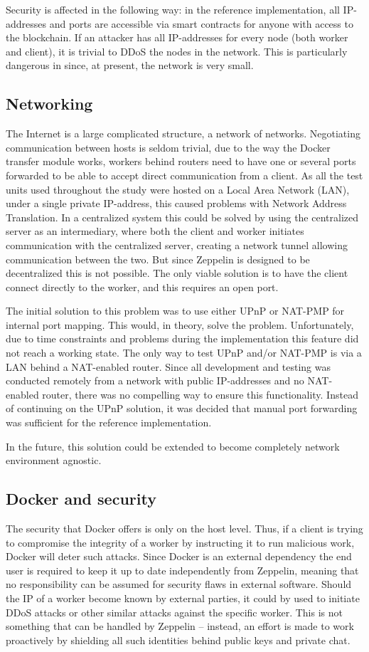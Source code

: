Security is affected in the following way: in the reference implementation, all IP-addresses and ports are accessible via smart contracts for anyone with access to the blockchain. If an attacker has all IP-addresses for every node (both worker and client), it is trivial to DDoS the nodes in the network. This is particularly dangerous in since, at present, the network is very small. 

\subsection{Networking}
The Internet is a large complicated structure, a network of networks. Negotiating communication between hosts is seldom trivial, due to the way the Docker transfer module works, workers behind routers need to have one or several ports forwarded to be able to accept direct communication from a client. As all the test units used throughout the study were hosted on a Local Area Network (LAN), under a single private IP-address, this caused problems with Network Address Translation. In a centralized system this could be solved by using the centralized server as an intermediary, where both the client and worker initiates communication with the centralized server, creating a network tunnel allowing communication between the two. But since Zeppelin is designed to be decentralized this is not possible. The only viable solution is to have the client connect directly to the worker, and this requires an open port.

The initial solution to this problem was to use either UPnP or NAT-PMP for internal port mapping. This would, in theory, solve the problem. Unfortunately, due to time constraints and problems during the implementation this feature did not reach a working state. The only way to test UPnP and/or NAT-PMP is via a LAN behind a NAT-enabled router. Since all development and testing was conducted remotely from a network with public IP-addresses and no NAT-enabled router, there was no compelling way to ensure this functionality. Instead of continuing on the UPnP solution, it was decided that manual port forwarding was sufficient for the reference implementation.

In the future, this solution could be extended to become completely network environment agnostic.

\subsection{Docker and security}
The security that Docker offers is only on the host level. Thus, if a client is trying to compromise the integrity of a worker by instructing it to run malicious work, Docker will deter such attacks. Since Docker is an external dependency the end user is required to keep it up to date independently from Zeppelin, meaning that no responsibility can be assumed for security flaws in external software. Should the IP of a worker become known by external parties, it could by used to initiate DDoS attacks or other similar attacks against the specific worker. This is not something that can be handled by Zeppelin -- instead, an effort is made to work proactively by shielding all such identities behind public keys and private chat.
